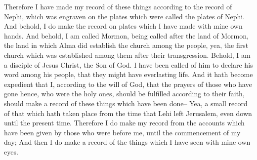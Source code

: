 Therefore I have made my record of these things according to the record of Nephi, which was engraven on the plates which were called the plates of Nephi.
\bverse \iffalse And behold, I do make the record on plates which I have made with mine own hands. \fi
And behold, I do make the record on plates which I have made with mine own hands.
\bverse \iffalse And behold, I am called Mormon, being called after the land of Mormon, the land in which Alma did establish the church among the people, yea, the first church which was established among them after their transgression. \fi
And behold, I am called Mormon, being called after the land of Mormon, the land in which Alma did establish the church among the people, yea, the first church which was established among them after their transgression.
\bverse \iffalse Behold, I am a disciple of Jesus Christ, the Son of God. I have been called of him to declare his word among his people, that they might have everlasting life. \fi
Behold, I am a disciple of Jesus Christ, the Son of God. I have been called of him to declare his word among his people, that they might have everlasting life.
\bverse \iffalse And it hath become expedient that I, according to the will of God, that the prayers of those who have gone hence, who were the holy ones, should be fulfilled according to their faith, should make a record of these things which have been done-- \fi
And it hath become expedient that I, according to the will of God, that the prayers of those who have gone hence, who were the holy ones, should be fulfilled according to their faith, should make a record of these things which have been done--
\bverse \iffalse Yea, a small record of that which hath taken place from the time that Lehi left Jerusalem, even down until the present time. \fi
Yea, a small record of that which hath taken place from the time that Lehi left Jerusalem, even down until the present time.
\bverse \iffalse Therefore I do make my record from the accounts which have been given by those who were before me, until the commencement of my day; \fi
Therefore I do make my record from the accounts which have been given by those who were before me, until the commencement of my day;
\bverse \iffalse And then I do make a record of the things which I have seen with mine own eyes. \fi
And then I do make a record of the things which I have seen with mine own eyes.
\bverse \iffalse And I know the record which I make to be a just and a true record; nevertheless there are many things which, according to our language, we are not able to write. \fi
